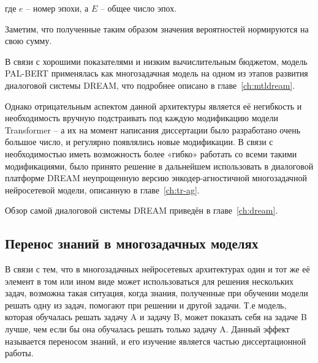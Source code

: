  где $e$ -- номер эпохи, а $E$ -- общее число эпох. 
 
Заметим, что полученные таким образом значения вероятностей нормируются на свою сумму. 

В связи с хорошими показателями и низким вычислительным бюджетом, модель PAL-BERT применялась как многозадачная модель на одном из этапов развития диалоговой системы DREAM, что подробнее описано в главе~\ref{ch:mtldream}.

Однако отрицательным аспектом данной архитектуры является её негибкость и необходимость вручную подстраивать под каждую модификацию модели Transformer -- а их на момент написания диссертации было разработано очень большое число, и регулярно появлялись новые модификации. В связи с необходимостью иметь возможность более «гибко» работать со всеми такими модификациями, было принято решение в дальнейшем использовать в диалоговой платформе {DREAM} неупрощенную версию энкодер-агностичной многозадачной нейросетевой модели, описанную в главе~\ref{ch:tr-ag}.

Обзор самой диалоговой системы {DREAM} приведён в главе~\ref{ch:dream}.

\subsection{Перенос знаний в многозадачных моделях}

В связи с тем, что в многозадачных нейросетевых архитектурах один и тот же её элемент в том или ином виде может использоваться для решения нескольких задач, возможна такая ситуация, когда знания, полученные при обучении модели решать одну из задач, помогают при решении и другой задачи. Т.е модель, которая обучалась решать задачу A и задачу B, может показать себя на задаче B лучше, чем если бы она обучалась решать только задачу A. Данный эффект называется переносом знаний, и его изучение является частью диссертационной работы.
